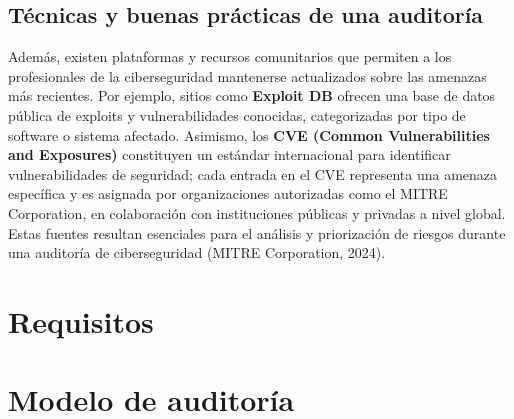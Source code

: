 \documentclass[a4paper, 10pt]{article}
\begin{document}
\subsection{Técnicas y buenas prácticas de una auditoría} 
Además, existen plataformas y recursos comunitarios que permiten a los profesionales de la ciberseguridad mantenerse actualizados sobre las amenazas más recientes. Por ejemplo, sitios como \textbf{Exploit DB} ofrecen una base de datos pública de exploits y vulnerabilidades conocidas, categorizadas por tipo de software o sistema afectado. Asimismo, los \textbf{CVE (Common Vulnerabilities and Exposures)} constituyen un estándar internacional para identificar vulnerabilidades de seguridad; cada entrada en el CVE representa una amenaza específica y es asignada por organizaciones autorizadas como el MITRE Corporation, en colaboración con instituciones públicas y privadas a nivel global. Estas fuentes resultan esenciales para el análisis y priorización de riesgos durante una auditoría de ciberseguridad (MITRE Corporation, 2024). \cite{mitre2024}
\clearpage




























\section{Requisitos}

\clearpage

\section{Modelo de auditoría}
\end{document}

